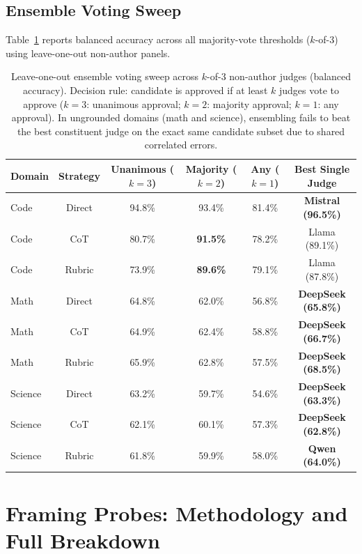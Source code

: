 \subsection{Ensemble Voting Sweep}
Table~\ref{tab:ensemble-full} reports balanced accuracy across all majority-vote thresholds ($k$-of-$3$) using leave-one-out non-author panels.

\begin{table}[H]
\centering
\small
\caption{Leave-one-out ensemble voting sweep across $k$-of-$3$ non-author judges (balanced accuracy). Decision rule: candidate is approved if at least $k$ judges vote to approve ($k=3$: unanimous approval; $k=2$: majority approval; $k=1$: any approval). In ungrounded domains (math and science), ensembling fails to beat the best constituent judge on the exact same candidate subset due to shared correlated errors.}
\label{tab:ensemble-full}
\begin{tabular}{lccccc}
\toprule
\bf Domain & \bf Strategy & \bf Unanimous ($k=3$) & \bf Majority ($k=2$) & \bf Any ($k=1$) & \bf Best Single Judge \\
\midrule
Code    & Direct & 94.8\% & 93.4\% & 81.4\% & \bf Mistral (96.5\%) \\
Code    & CoT    & 80.7\% & \bf 91.5\% & 78.2\% & Llama (89.1\%) \\
Code    & Rubric & 73.9\% & \bf 89.6\% & 79.1\% & Llama (87.8\%) \\
\midrule
Math    & Direct & 64.8\% & 62.0\% & 56.8\% & \bf DeepSeek (65.8\%) \\
Math    & CoT    & 64.9\% & 62.4\% & 58.8\% & \bf DeepSeek (66.7\%) \\
Math    & Rubric & 65.9\% & 62.8\% & 57.5\% & \bf DeepSeek (68.5\%) \\
\midrule
Science & Direct & 63.2\% & 59.7\% & 54.6\% & \bf DeepSeek (63.3\%) \\
Science & CoT    & 62.1\% & 60.1\% & 57.3\% & \bf DeepSeek (62.8\%) \\
Science & Rubric & 61.8\% & 59.9\% & 58.0\% & \bf Qwen (64.0\%) \\
\bottomrule
\end{tabular}
\end{table}

\section{Framing Probes: Methodology and Full Breakdown}
\label{app:framing}


